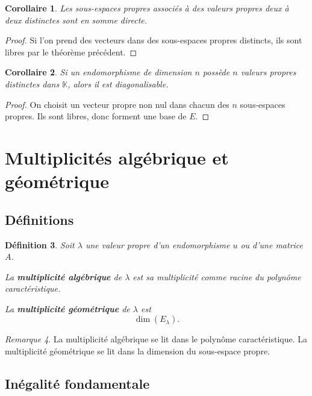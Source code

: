 \documentclass[11pt,a4paper]{article}
\newtheorem{definition}{Définition}[section]
\newtheorem{corollaire}[definition]{Corollaire}
\theoremstyle{remark}
\newtheorem{remarque}[definition]{Remarque}
\newcommand{\K}{\mathbb{K}}
\begin{document}
\begin{corollaire}
Les sous-espaces propres associés à des valeurs propres deux à deux distinctes sont en somme directe.
\end{corollaire}

\begin{proof}
Si l’on prend des vecteurs dans des sous-espaces propres distincts, ils sont libres par le théorème précédent.
\end{proof}

\begin{corollaire}
Si un endomorphisme de dimension \(n\) possède \(n\) valeurs propres distinctes dans \(\K\), alors il est diagonalisable.
\end{corollaire}

\begin{proof}
On choisit un vecteur propre non nul dans chacun des \(n\) sous-espaces propres. Ils sont libres, donc forment une base de \(E\).
\end{proof}

\section{Multiplicités algébrique et géométrique}

\subsection{Définitions}

\begin{definition}
Soit \(\lambda\) une valeur propre d’un endomorphisme \(u\) ou d’une matrice \(A\).

La \textbf{multiplicité algébrique} de \(\lambda\) est sa multiplicité comme racine du polynôme caractéristique.

La \textbf{multiplicité géométrique} de \(\lambda\) est
\[
\dim(E_\lambda).
\]
\end{definition}

\begin{remarque}
La multiplicité algébrique se lit dans le polynôme caractéristique.  
La multiplicité géométrique se lit dans la dimension du sous-espace propre.
\end{remarque}

\subsection{Inégalité fondamentale}
\end{document}
